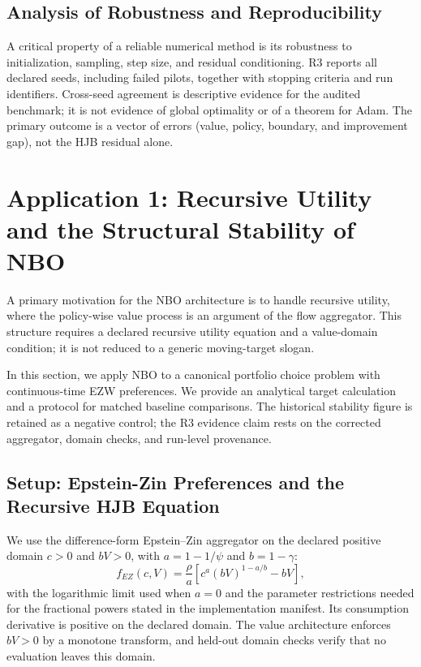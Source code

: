 \documentclass[ecta]{econsocart}
\theoremstyle{plain}
\theoremstyle{remark}
\begin{document}
\subsection{Analysis of Robustness and Reproducibility}

A critical property of a reliable numerical method is its robustness to initialization, sampling, step size, and residual conditioning. R3 reports all declared seeds, including failed pilots, together with stopping criteria and run identifiers. Cross-seed agreement is descriptive evidence for the audited benchmark; it is not evidence of global optimality or of a theorem for Adam. The primary outcome is a vector of errors (value, policy, boundary, and improvement gap), not the HJB residual alone.

\section{Application 1: Recursive Utility and the Structural Stability of NBO}
\label{sec:recursive_test}

A primary motivation for the NBO architecture is to handle recursive utility, where the policy-wise value process is an argument of the flow aggregator. This structure requires a declared recursive utility equation and a value-domain condition; it is not reduced to a generic moving-target slogan.

In this section, we apply NBO to a canonical portfolio choice problem with continuous-time EZW preferences. We provide an analytical target calculation and a protocol for matched baseline comparisons. The historical stability figure is retained as a negative control; the R3 evidence claim rests on the corrected aggregator, domain checks, and run-level provenance.

\subsection{Setup: Epstein-Zin Preferences and the Recursive HJB Equation}
We use the difference-form Epstein--Zin aggregator on the declared positive domain $c>0$ and $bV>0$, with $a=1-1/\psi$ and $b=1-\gamma$:
\begin{equation}
 f_{EZ}(c,V)=\frac{\rho}{a}\left[c^a(bV)^{1-a/b}-bV\right],
\label{eq:ez_aggregator}
\end{equation}
with the logarithmic limit used when $a=0$ and the parameter restrictions needed for the fractional powers stated in the implementation manifest. Its consumption derivative is positive on the declared domain. The value architecture enforces $bV>0$ by a monotone transform, and held-out domain checks verify that no evaluation leaves this domain.
\end{document}
